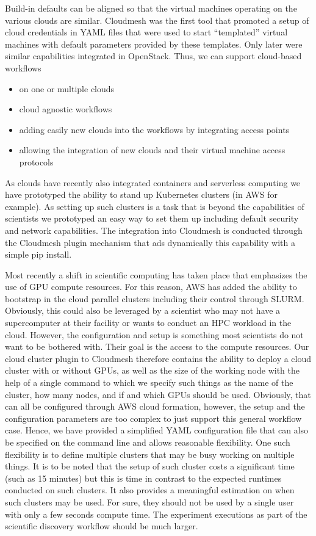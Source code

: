 \documentclass[utf8]{FrontiersinVancouver} %
\begin{document}
Build-in defaults can be aligned so that the virtual machines operating on the various clouds are similar.
Cloudmesh was the first tool that promoted a setup of cloud credentials in YAML files that were used to start ``templated'' virtual machines with default parameters provided by these templates. Only later were similar capabilities integrated in OpenStack. Thus, we can support cloud-based workflows

\begin{itemize}
    \item on one or multiple clouds
    \item cloud agnostic workflows
    \item adding easily new clouds into the workflows by integrating access points
    \item allowing the integration of new clouds and their virtual machine access protocols
\end{itemize}

As clouds have recently also integrated containers and serverless computing we have prototyped the ability to stand up Kubernetes clusters (in AWS for example). As setting up such clusters is a task that is beyond the capabilities of scientists we prototyped an easy way to set them up including default security and network capabilities. The integration into Cloudmesh is conducted through the Cloudmesh plugin mechanism that ads dynamically this capability with a simple pip install.

Most recently a shift in scientific computing has taken place that emphasizes the use of GPU compute resources. For this reason, AWS has added the ability to bootstrap in the cloud parallel clusters including their control through SLURM. Obviously, this could also be leveraged by a scientist who may not have a supercomputer at their facility or wants to conduct an HPC workload in the cloud. However, the configuration and setup is something most scientists do not want to be bothered with. Their goal is the access to the compute resources. Our cloud cluster plugin to Cloudmesh therefore contains the ability to deploy a cloud cluster with or without GPUs, as well as the size of the working node with the help of a single command to which we specify such things as the name of the cluster, how many nodes, and if and which GPUs should be used. Obviously, that can all be configured through AWS cloud formation, however, the setup and the configuration parameters are too complex to just support this general workflow case. Hence, we have provided a simplified YAML configuration file that can also be specified on the command line and allows reasonable flexibility. One such flexibility is to define multiple clusters that may be busy working on multiple things. It is to be noted that the setup of such cluster costs a significant time (such as 15 minutes) but this is time in contrast to the expected runtimes conducted on such clusters. It also provides a meaningful estimation on when such clusters may be used. For sure, they should not be used by a single user with only a few seconds compute time.  The experiment executions as part of the scientific discovery workflow should be much larger.
\end{document}
